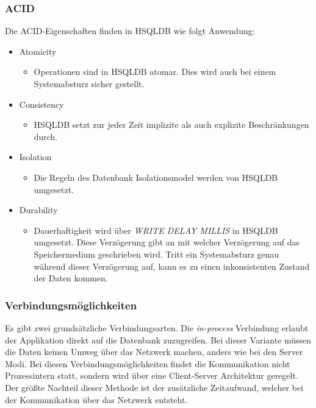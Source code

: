 \documentclass[draft,final]{vutinfth} %
\begin{document}
\subsubsection*{ACID}
Die ACID-Eigenschaften finden in HSQLDB wie folgt Anwendung:
\begin{itemize}
	\item Atomicity
	\begin{itemize}
		\item Operationen sind in HSQLDB atomar. Dies wird auch bei einem Systemabsturz sicher gestellt.
	\end{itemize}
	\item Consistency
	\begin{itemize}
		\item HSQLDB setzt zur jeder Zeit implizite als auch explizite Beschränkungen durch.
	\end{itemize}
	\item Isolation
	\begin{itemize}
		\item Die Regeln des Datenbank Isolationsmodel werden von HSQLDB umgesetzt.
	\end{itemize}
	\item Durability
	\begin{itemize}
		\item Dauerhaftigkeit wird über \textit{WRITE DELAY MILLIS} in HSQLDB umgesetzt. Diese Verzögerung gibt an mit welcher Verzögerung auf das Speichermedium geschrieben wird. Tritt ein Systemabsturz genau während dieser Verzögerung auf, kann es zu einen inkonsistenten Zustand der Daten kommen.
	\end{itemize}
\end{itemize}

\subsubsection*{Verbindungsmöglichkeiten}

Es gibt zwei grundsätzliche Verbindungsarten. Die \textit{in-process} Verbindung erlaubt der Applikation direkt auf die Datenbank zuzugreifen. Bei dieser Variante müssen die Daten keinen Umweg über das Netzwerk machen, anders wie bei den Server Modi. Bei diesen Verbindungsmöglichkeiten findet die Kommunikation nicht Prozessintern statt, sondern wird über eine Client-Server Architektur geregelt. Der grö\ss te Nachteil dieser Methode ist der zusätzliche Zeitaufwand, welcher bei der Kommunikation über das Netzwerk entsteht. 
\end{document}
